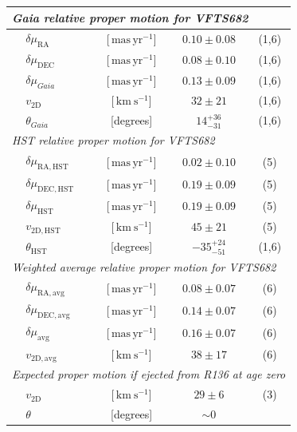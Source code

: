 \documentclass[a4paper,fleqn,usenatbib]{mnras}
\newcommand{\SdM}[1]{{{\color{brown}{#1}}}}
\newcommand{\kms}{{\,\mathrm{km\ s^{-1}}}}
\newcommand{\masyr}{\,\mathrm{mas}\,\mathrm{yr}^{-1}}
\begin{document}
\begin{table}
\begin{center}
\begin{tabular}{llc|c|c}
                


      \multicolumn{5}{l}{\emph{Gaia relative proper motion for VFTS682 }} \\
      \hline
      &$\delta\mu_\mathrm{RA}$  &[$\masyr$] & $0.10\pm0.08$ & (1,6) \\
      &$\delta\mu_\mathrm{DEC}$  &[$\masyr$] & $0.08\pm0.10$ &  (1,6) \\
      &$\delta\mu_{Gaia}$  &[$\masyr$] & $0.13\pm0.09$ &  (1,6) \\
      &$v_\mathrm{2D}$  &[$\kms$] & $32\pm21$ & (1,6)\\  
      &$\theta_{Gaia}$  &[degrees] &  $14_{-31}^{+36}$  & (1,6)\\  

 \hline     
      \multicolumn{5}{l}{\emph{HST relative proper motion for VFTS682}} \\
            \hline
      &$\delta\mu_\mathrm{RA, HST}$  &[$\masyr$] & $0.02\pm0.10$ & (5) \\
      &$\delta\mu_\mathrm{DEC, HST}$  &[$\masyr$] & $0.19\pm0.09$ &  (5) \\
       &$\delta\mu_\mathrm{HST}$  &[$\masyr$] & $0.19\pm0.09$ &  (5) \\
                  &$v_\mathrm{2D, HST}$  &[$\kms$] & $45\pm21$ & (5)\\  
                      &$\theta_\mathrm{HST}$  &[degrees] &   $-35_{-51}^{+24}$   & (1,6)\\  
      \hline
      \multicolumn{5}{l}{\emph{Weighted average relative proper motion
      for VFTS682}}\\
      \hline
      &$\delta\mu_\mathrm{RA, avg}$  &[$\masyr$] & $0.08\pm0.07$ & (6) \\
      &$\delta\mu_\mathrm{DEC, avg}$  &[$\masyr$] & $0.14\pm0.07$ &  (6) \\
       &$\delta\mu_\mathrm{avg}$  &[$\masyr$] & $0.16\pm0.07$ &  (6) \\
      &$v_\mathrm{2D, avg}$  &[$\kms$] & $38\pm17$ & (6)\\
      \hline
       \multicolumn{5}{l}{\emph{Expected proper motion if ejected from
      R136 at age zero}} \\
      \hline
      &$v_\mathrm{2D}$  &[$\kms$] & $29\pm 6$ & (3) \\  
      &$\theta$  &[degrees] &  $\sim0$  & \\ 
       \hline


\end{tabular}
\end{center}
\end{table}
\end{document}

